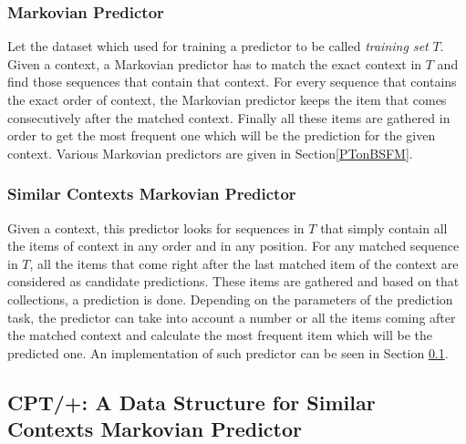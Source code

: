 \subsubsection{Markovian Predictor}
Let the dataset which used for training a predictor to be called \emph{training set} $T$. Given a context, a Markovian predictor has to match the exact context in $T$ and find those sequences that contain that context. For every sequence that contains the exact order of context, the Markovian predictor keeps the item that comes consecutively after the matched context. Finally all these items are gathered in order to get the most frequent one which will be the prediction for the given context. Various Markovian predictors are given in Section\ref{PTonBSFM}.
\subsubsection{Similar Contexts Markovian Predictor}{\label{SCMP}}
Given a context, this predictor looks for sequences in $T$ that simply contain all the items of context in any order and in any position. For any matched sequence in $T$, all the items that come right after the last matched item of the context are considered as candidate predictions. These items are gathered and based on that collections, a prediction is done. Depending on the parameters of the prediction task, the predictor can take into account a number or all the items coming after the matched context and calculate the most frequent item which will be the predicted one. An implementation of such predictor can be seen in Section \ref{CPT}.

\subsection{CPT/+: A Data Structure for Similar Contexts Markovian Predictor} \label{CPT}

